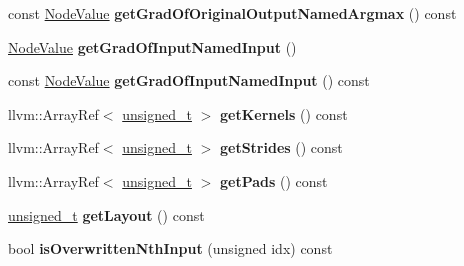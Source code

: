 \begin{DoxyCompactItemize}
\item 
\mbox{\label{classglow_1_1_max_pool_grad_node_aaf5c903927928f9051ba651b2f662f86}} 
const \hyperlink{structglow_1_1_node_value}{Node\+Value} {\bfseries get\+Grad\+Of\+Original\+Output\+Named\+Argmax} () const
\item 
\mbox{\label{classglow_1_1_max_pool_grad_node_a05f1627661634319f49c62482ed79ac9}} 
\hyperlink{structglow_1_1_node_value}{Node\+Value} {\bfseries get\+Grad\+Of\+Input\+Named\+Input} ()
\item 
\mbox{\label{classglow_1_1_max_pool_grad_node_a48b692374488ced77c120f68b906c5d8}} 
const \hyperlink{structglow_1_1_node_value}{Node\+Value} {\bfseries get\+Grad\+Of\+Input\+Named\+Input} () const
\item 
\mbox{\label{classglow_1_1_max_pool_grad_node_ab74ea070a14411e54b95b4f96fba326c}} 
llvm\+::\+Array\+Ref$<$ \hyperlink{namespaceglow_a0ca574644e1e42ef193a9947fb4d8911}{unsigned\+\_\+t} $>$ {\bfseries get\+Kernels} () const
\item 
\mbox{\label{classglow_1_1_max_pool_grad_node_a7eb3eb939828cbdc4db116a19160f9d5}} 
llvm\+::\+Array\+Ref$<$ \hyperlink{namespaceglow_a0ca574644e1e42ef193a9947fb4d8911}{unsigned\+\_\+t} $>$ {\bfseries get\+Strides} () const
\item 
\mbox{\label{classglow_1_1_max_pool_grad_node_accfc7b4835539ba8f2974f7848522d57}} 
llvm\+::\+Array\+Ref$<$ \hyperlink{namespaceglow_a0ca574644e1e42ef193a9947fb4d8911}{unsigned\+\_\+t} $>$ {\bfseries get\+Pads} () const
\item 
\mbox{\label{classglow_1_1_max_pool_grad_node_aca33e52c1177cbd24bbdcfb334e832b4}} 
\hyperlink{namespaceglow_a0ca574644e1e42ef193a9947fb4d8911}{unsigned\+\_\+t} {\bfseries get\+Layout} () const
\item 
\mbox{\label{classglow_1_1_max_pool_grad_node_a2fbeb04cb26b13d1b5b8afed4f87f402}} 
bool {\bfseries is\+Overwritten\+Nth\+Input} (unsigned idx) const

\end{DoxyCompactItemize}
